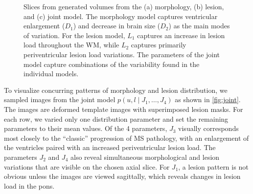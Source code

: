 \begin{figure}[tb]
{
} \caption[Slices from generated volumes from the morphology, lesion,
and joint model]{Slices from generated volumes from the (a) morphology, (b)
lesion, and (c) joint model. The morphology model captures ventricular
enlargement ($D_1$) and decrease in brain size ($D_2$) as the main modes of
variation. For the lesion model, $L_1$ captures an increase in lesion load
throughout the WM, while $L_2$ captures primarily periventricular lesion load
variations. The parameters of the joint model capture combinations
of the variability found in the individual models.}
\label{fig:samples}
\end{figure}

To visualize concurring patterns of morphology and lesion distribution, we
sampled images from the joint model $p(u, l \mid J_1, \dotsc, J_4)$ as shown in
\ref{fig:joint}. The images are deformed template images with superimposed
lesion masks. For each row, we varied only one distribution parameter and set
the remaining parameters to their mean values. Of the 4 parameters, $J_3$
visually corresponds most closely to the ``classic'' progression of MS
pathology, with an enlargement of the ventricles paired with an increased
periventricular lesion load. The parameters $J_2$ and $J_4$ also reveal
simultaneous morphological and lesion variations that are visible on the chosen
axial slice. For $J_1$, a lesion pattern is not obvious unless the images are
viewed sagittally, which reveals changes in lesion load in the pons.

